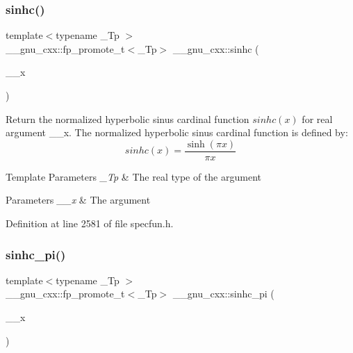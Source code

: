 \mbox{\label{group__mathsf__gnu_gaf2f02e4143e7beb97352cef4b7fcb663}} 
\subsubsection{\texorpdfstring{sinhc()}{sinhc()}}
{\footnotesize\ttfamily template$<$typename \+\_\+\+Tp $>$ \\
\+\_\+\+\_\+gnu\+\_\+cxx\+::fp\+\_\+promote\+\_\+t$<$\+\_\+\+Tp$>$ \+\_\+\+\_\+gnu\+\_\+cxx\+::sinhc (\begin{DoxyParamCaption}\item[{\+\_\+\+Tp}]{\+\_\+\+\_\+x }\end{DoxyParamCaption})\hspace{0.3cm}{\ttfamily [inline]}}

Return the normalized hyperbolic sinus cardinal function $ sinhc(x) $ for real argument {\ttfamily \+\_\+\+\_\+x}. The normalized hyperbolic sinus cardinal function is defined by\+: \[ sinhc(x) = \frac{\sinh(\pi x)}{\pi x} \]


\begin{DoxyTemplParams}{Template Parameters}
{\em \+\_\+\+Tp} & The real type of the argument \\
\hline
\end{DoxyTemplParams}

\begin{DoxyParams}{Parameters}
{\em \+\_\+\+\_\+x} & The argument \\
\hline
\end{DoxyParams}


Definition at line 2581 of file specfun.\+h.

\mbox{\label{group__mathsf__gnu_ga8bb6034e28d48879845bf64818cc06e1}} 
\subsubsection{\texorpdfstring{sinhc\+\_\+pi()}{sinhc\_pi()}}
{\footnotesize\ttfamily template$<$typename \+\_\+\+Tp $>$ \\
\+\_\+\+\_\+gnu\+\_\+cxx\+::fp\+\_\+promote\+\_\+t$<$\+\_\+\+Tp$>$ \+\_\+\+\_\+gnu\+\_\+cxx\+::sinhc\+\_\+pi (\begin{DoxyParamCaption}\item[{\+\_\+\+Tp}]{\+\_\+\+\_\+x }\end{DoxyParamCaption})\hspace{0.3cm}{\ttfamily [inline]}}

